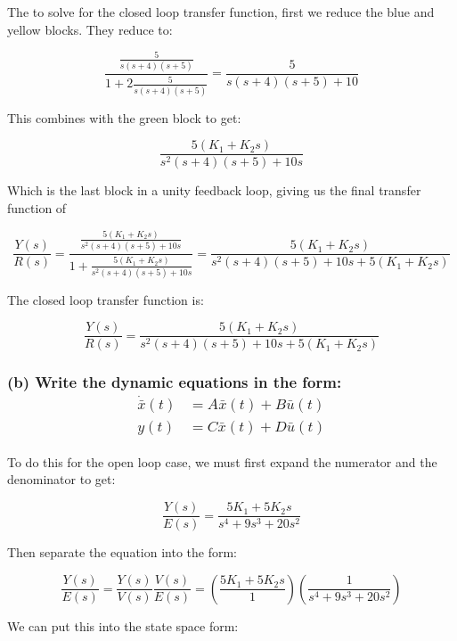 \documentclass[12pt, letterpaper]{../assignment}
\begin{document}
The to solve for the closed loop transfer function, first we reduce the blue and yellow blocks.
They reduce to:

\begin{equation*}
    \frac{\frac{5}{s(s+4)(s+5)}}{1 + 2\frac{5}{s(s+4)(s+5)}} = 
    \frac{5}{s(s+4)(s+5) + 10}
\end{equation*}

This combines with the green block to get:

\begin{equation*}
    \frac{5(K_1 + K_2 s)}{s^2(s+4)(s+5) + 10s}
\end{equation*}

Which is the last block in a unity feedback loop, giving us the final transfer function of 

$$ \frac{Y(s)}{R(s)} = \frac{\frac{5(K_1 + K_2 s)}{s^2(s+4)(s+5) + 10s}}{1 +\frac{5(K_1 + K_2 s)}{s^2(s+4)(s+5) + 10s}}
= \frac{5(K_1 + K_2 s)}{s^2(s+4)(s+5) + 10s +5(K_1 + K_2 s)} $$

The closed loop transfer function is:

\begin{answer}
$$ \frac{Y(s)}{R(s)} = \frac{5(K_1 + K_2 s)}{s^2(s+4)(s+5) + 10s +5(K_1 + K_2 s)} $$
\end{answer}

\subsubsection*{(b) Write the dynamic equations in the form:\\
{\boldmath} \begin{equation*}
    \begin{aligned}
        \dot{\bar{x}}(t) &= A \bar{x}(t) + B \bar{u}(t)\\
        y(t) &= C \bar{x} (t) + D \bar{u}(t)
    \end{aligned}
\end{equation*}}

To do this for the open loop case, we must first expand the numerator and the denominator to get:

$$ \frac{Y(s)}{E(s)} = \frac{5K_1 + 5K_2 s}{s^4 + 9 s^3 + 20 s^2} $$

Then separate the equation into the form:

$$ \frac{Y(s)}{E(s)} = \frac{Y(s)}{V(s)} \frac{V(s)}{E(s)} = \left(\frac{5K_1 + 5K_2 s}{1}\right) \left(\frac{1}{s^4 + 9 s^3 + 20 s^2}\right) $$

We can put this into the state space form:
\end{document}
